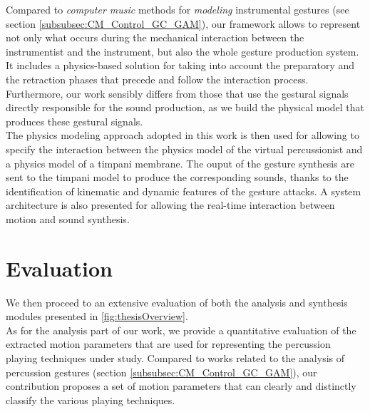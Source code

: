 Compared to \emph{computer music} methods for \emph{modeling} instrumental gestures (see section \ref{subsubsec:CM_Control_GC_GAM}), our framework allows to represent not only what occurs during the mechanical interaction between the instrumentist and the instrument, but also the whole gesture production system. It includes a physics-based solution for taking into account the preparatory and the retraction phases that precede and follow the interaction process. Furthermore, our work sensibly differs from those that use the gestural signals directly responsible for the sound production, as we build the physical model that produces these gestural signals.\\

The physics modeling approach adopted in this work is then used for allowing to specify the interaction between the physics model of the virtual percussionist and a physics model of a timpani membrane. The ouput of the gesture synthesis are sent to the timpani model to produce the corresponding sounds, thanks to the identification of kinematic and dynamic features of the gesture attacks. A system architecture is also presented for allowing the real-time interaction between motion and sound synthesis.




	\section{Evaluation}

We then proceed to an extensive evaluation of both the analysis and synthesis modules presented in \myfigname \ref{fig:thesisOverview}.\\

As for the analysis part of our work, we provide a quantitative evaluation of the extracted motion parameters that are used for representing the percussion playing techniques under study. %
Compared to works related to the analysis of percussion gestures (section \ref{subsubsec:CM_Control_GC_GAM}), our contribution %
proposes a set of motion parameters that can clearly and distinctly classify the various playing techniques.\\

